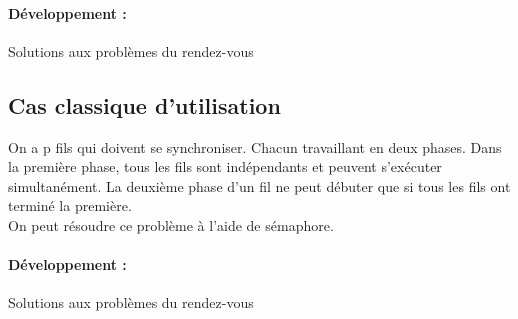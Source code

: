 \paragraph{Développement :} Solutions aux problèmes du rendez-vous

\subsection{Cas classique d'utilisation}

\begin{appl}
	On a p fils qui doivent se synchroniser. Chacun travaillant en deux phases. Dans la première phase, tous les fils sont indépendants et peuvent s’exécuter simultanément. La deuxième phase d'un fil ne peut débuter que si tous les fils ont terminé la première.\\
	
	On peut résoudre ce problème à l'aide de sémaphore.
\end{appl}

\paragraph{Développement :} Solutions aux problèmes du rendez-vous

